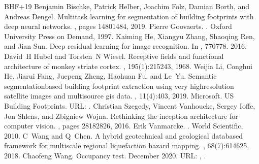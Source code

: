 \documentclass[letterpaper,10pt,english]{sphinxmanual}
\begin{document}
\begin{sphinxthebibliography}{BHF+19}
\sphinxAtStartPar
Benjamin Bischke, Patrick Helber, Joachim Folz, Damian Borth, and Andreas Dengel. Multi\sphinxhyphen{}task learning for segmentation of building footprints with deep neural networks. , pages 1480\textendash{}1484, 2019.
\sphinxAtStartPar
Pierre Goovaerts. . Oxford University Press on Demand, 1997.
\sphinxAtStartPar
Kaiming He, Xiangyu Zhang, Shaoqing Ren, and Jian Sun. Deep residual learning for image recognition. In , 770\textendash{}778. 2016.
\sphinxAtStartPar
David H Hubel and Torsten N Wiesel. Receptive fields and functional architecture of monkey striate cortex. , 195(1):215\textendash{}243, 1968.
\sphinxAtStartPar
Weijia Li, Conghui He, Jiarui Fang, Juepeng Zheng, Haohuan Fu, and Le Yu. Semantic segmentation\sphinxhyphen{}based building footprint extraction using very high\sphinxhyphen{}resolution satellite images and multi\sphinxhyphen{}source gis data. , 11(4):403, 2019.
\sphinxAtStartPar
Microsoft. US Building Footprints. URL: .
\sphinxAtStartPar
Christian Szegedy, Vincent Vanhoucke, Sergey Ioffe, Jon Shlens, and Zbigniew Wojna. Rethinking the inception architecture for computer vision. , pages 2818\textendash{}2826, 2016.
\sphinxAtStartPar
Erik Vanmarcke. . World Scientific, 2010.
\sphinxAtStartPar
C Wang and Q Chen. A hybrid geotechnical and geological data\sphinxhyphen{}based framework for multiscale regional liquefaction hazard mapping. , 68(7):614\textendash{}625, 2018.
\sphinxAtStartPar
Chaofeng Wang. Occupancy test. December 2020. URL: , .

\end{sphinxthebibliography}
\end{document}

